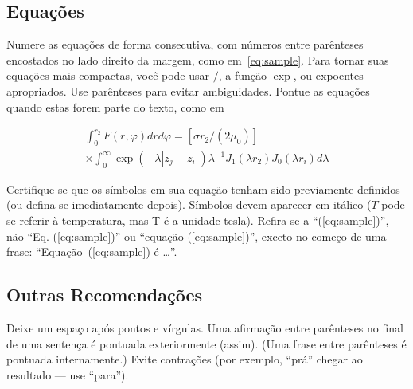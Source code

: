\subsection{Equações}

Numere as equações de forma consecutiva, com números entre parênteses
encostados no lado direito da
margem, como em~\eqref{eq:sample}. Para tornar suas equações mais compactas,
você pode usar $/$, a função $\exp$, ou expoentes apropriados. Use parênteses para
evitar ambiguidades. Pontue as equações quando estas forem parte do texto, como em

\begin{multline} 
\int_0^{r_2}  F (r, \varphi ) dr d\varphi =  [\sigma r_2 / (2 \mu_0 )] \\
\times   \int_0^{\infty} \exp(-\lambda |z_j - z_i |) \lambda^{-1} J_1 (\lambda  r_2 ) J_0 (\lambda r_i ) d\lambda 
\label{eq:sample2}
\end{multline}

Certifique-se que os símbolos em sua equação tenham sido previamente definidos (ou defina-se imediatamente depois). Símbolos devem aparecer em itálico ($T$ pode
se referir à temperatura, mas T é a unidade tesla). 
Refira-se a ``(\ref{eq:sample})'', não ``Eq. (\ref{eq:sample})'' ou ``equação
(\ref{eq:sample})'', exceto no começo de uma frase: ``Equação~(\ref{eq:sample}) é \ldots''. 

\subsection{Outras Recomendações}

Deixe um espaço após pontos e vírgulas. 
Uma afirmação entre parênteses no final de uma sentença é pontuada exteriormente
(assim). (Uma frase entre parênteses é pontuada internamente.) Evite contrações
(por exemplo, ``prá'' chegar ao resultado --- use ``para''). 




